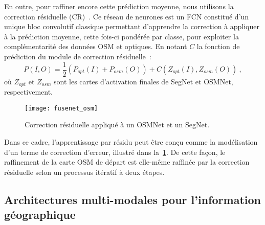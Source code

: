 En outre, pour raffiner encore cette prédiction moyenne, nous utilisons la correction résiduelle (CR)~\cite{audebert_semantic_2016}. Ce réseau de neurones est un FCN constitué d'un unique bloc convolutif classique permettant d'apprendre la correction à appliquer à la prédiction moyenne, cette fois-ci pondérée par classe, pour exploiter la complémentarité des données OSM et optiques. En notant $C$ la fonction de prédiction du module de correction résiduelle~:
\begin{equation}
P(I, O) = \frac{1}{2} (P_{opt}(I) + P_{osm}(O)) + C(Z_{opt}(I), Z_{osm}(O))~,
\end{equation}
où $Z_{opt}$ et $Z_{osm}$ sont les cartes d'activation finales de SegNet et OSMNet, respectivement.

\begin{figure}[t]
  \centering
  \texttt{[image: fusenet\_osm]}
  \caption{Correction résiduelle appliqué à un OSMNet et un SegNet.}
  \label{fig:refinet}
\end{figure}

Dans ce cadre, l'apprentissage par résidu peut être conçu comme la modélisation d'un terme de correction d'erreur, illustré dans la~\cref{fig:refinet}. De cette façon, le raffinement de la carte OSM de départ est elle-même raffinée par la correction résiduelle selon un processus itératif à deux étapes.

\subsection{Architectures multi-modales pour l'information géographique}


